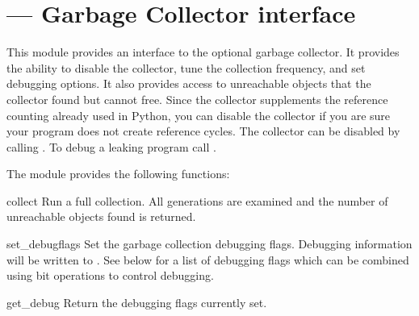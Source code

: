 \section{ ---
         Garbage Collector interface}


This module provides an interface to the optional garbage collector.
It provides the ability to disable the collector, tune the collection
frequency, and set debugging options.  It also provides access to
unreachable objects that the collector found but cannot free.  Since
the collector supplements the reference counting already used in
Python, you can disable the collector if you are sure your program
does not create reference cycles.  The collector can be disabled by
calling .  To debug a leaking program call
.

The  module provides the following functions:

\begin{funcdesc}{collect}{}
Run a full collection.  All generations are examined and the
number of unreachable objects found is returned.
\end{funcdesc}

\begin{funcdesc}{set_debug}{flags}
Set the garbage collection debugging flags.
Debugging information will be written to .  See below
for a list of debugging flags which can be combined using bit
operations to control debugging.
\end{funcdesc}

\begin{funcdesc}{get_debug}{}
Return the debugging flags currently set.
\end{funcdesc}

